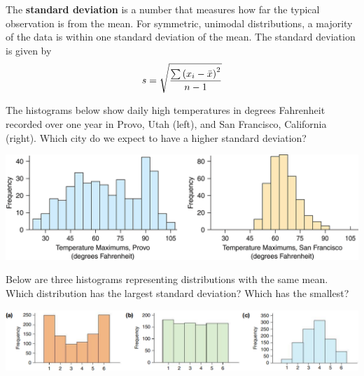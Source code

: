 \documentclass[../mathNotesPreamble]{subfiles}
\begin{document}
  \begin{defn*}
    The \textbf{standard deviation} is a number that measures how far the typical observation is from the mean. For symmetric, unimodal distributions, a majority of the data is within one standard deviation of the mean. The standard deviation is given by
      \[s=\sqrt{\frac{\sum {\left(x_i-\bar{x}\right)}^2}{n-1}}\]
    \vspace*{-0.75\baselineskip}
  \end{defn*}
  
  \begin{ex*}
    The histograms below show daily high temperatures in degrees Fahrenheit recorded over one year in Provo, Utah (left), and San Francisco, California (right). Which city do we expect to have a higher standard deviation?
  \end{ex*}
  \begin{center}
    \includegraphics[width=0.8\linewidth]{images/math211_figure_3p7}
  \end{center}
  
  \begin{ex*}
    Below are three histograms representing distributions with the same mean. Which distribution has the largest standard deviation? Which has the smallest?
  \end{ex*}
  \begin{center}
    \includegraphics[width=0.95\linewidth]{images/math211_figure_3p8}
  \end{center}
  \pagebreak
\end{document}
